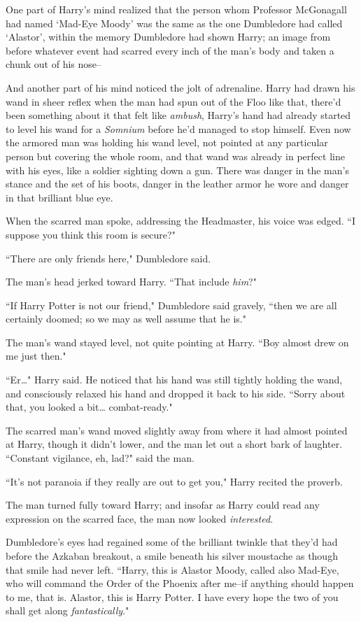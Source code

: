 One part of Harry's mind realized that the person whom Professor McGonagall had named `Mad-Eye Moody' was the same as the one Dumbledore had called `Alastor', within the memory Dumbledore had shown Harry; an image from before whatever event had scarred every inch of the man's body and taken a chunk out of his nose\---

And another part of his mind noticed the jolt of adrenaline. Harry had drawn his wand in sheer reflex when the man had spun out of the Floo like that, there'd been something about it that felt like \emph{ambush}, Harry's hand had already started to level his wand for a \emph{Somnium} before he'd managed to stop himself. Even now the armored man was holding his wand level, not pointed at any particular person but covering the whole room, and that wand was already in perfect line with his eyes, like a soldier sighting down a gun. There was danger in the man's stance and the set of his boots, danger in the leather armor he wore and danger in that brilliant blue eye.

When the scarred man spoke, addressing the Headmaster, his voice was edged. ``I suppose you think this room is secure?"

``There are only friends here," Dumbledore said.

The man's head jerked toward Harry. ``That include \emph{him}?"

``If Harry Potter is not our friend," Dumbledore said gravely, ``then we are all certainly doomed; so we may as well assume that he is."

The man's wand stayed level, not quite pointing at Harry. ``Boy almost drew on me just then."

``Er{\ldots}" Harry said. He noticed that his hand was still tightly holding the wand, and consciously relaxed his hand and dropped it back to his side. ``Sorry about that, you looked a bit{\ldots} combat-ready."

The scarred man's wand moved slightly away from where it had almost pointed at Harry, though it didn't lower, and the man let out a short bark of laughter. ``Constant vigilance, eh, lad?" said the man.

``It's not paranoia if they really are out to get you," Harry recited the proverb.

The man turned fully toward Harry; and insofar as Harry could read any expression on the scarred face, the man now looked \emph{interested}.

Dumbledore's eyes had regained some of the brilliant twinkle that they'd had before the Azkaban breakout, a smile beneath his silver moustache as though that smile had never left. ``Harry, this is Alastor Moody, called also Mad-Eye, who will command the Order of the Phoenix after me\---if anything should happen to me, that is. Alastor, this is Harry Potter. I have every hope the two of you shall get along \emph{fantastically}."


